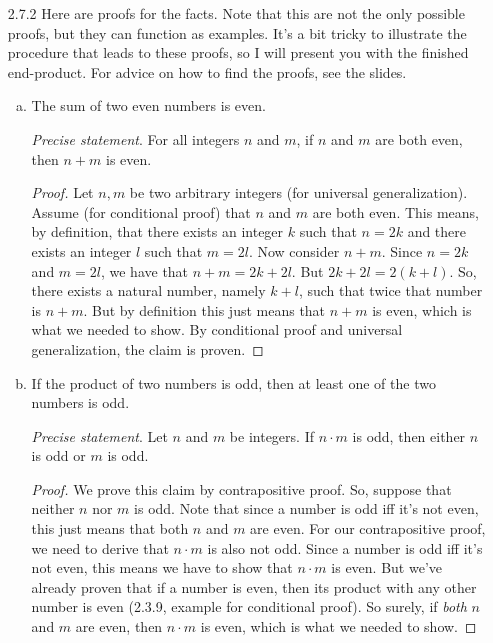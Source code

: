 \begin{enumerate}
		\item[2.7.2] Here are proofs for the facts. Note that this are not the only possible proofs, but they can function as examples. It's a bit tricky to illustrate the procedure that leads to these proofs, so I will present you with the finished end-product. For advice on how to find the proofs, see the slides.

			\begin{enumerate}[(a)]

			\item  The sum of two even numbers is even.
			
				\emph{Precise statement}. For all integers $n$ and $m$, if $n$ and $m$ are both even, then $n+m$ is even.
			
				\begin{proof}
				Let $n,m$ be two arbitrary integers (for universal generalization). Assume (for conditional proof) that $n$ and $m$ are both even. This means, by definition, that there exists an integer $k$ such that $n=2k$ and there exists an integer $l$ such that $m=2l$. Now consider $n+m$. Since $n=2k$ and $m=2l$, we have that $n+m=2k+2l$. But $2k+2l=2(k+l)$. So, there exists a natural number, namely $k+l$, such that twice that number is $n+m$. But by definition this just means that $n+m$ is even, which is what we needed to show. By conditional proof and universal generalization, the claim is proven.
				\end{proof}
			
			\item If the product of two numbers is odd, then at least one of the two numbers is odd. 
			
			\emph{Precise statement}. Let $n$ and $m$ be integers. If $n\cdot m$ is odd, then either $n$ is odd or $m$ is odd.
			
				\begin{proof}
				We prove this claim by contrapositive proof. So, suppose that neither $n$ nor $m$ is odd. Note that since a number is odd iff it's not even, this just means that both $n$ and $m$ are even. For our contrapositive proof, we need to derive that $n\cdot m$ is also not odd. Since a number is odd iff it's not even, this means we have to show that $n\cdot m$ is even.  But we've already proven that if a number is even, then its product with any other number is even (2.3.9, example for conditional proof). So surely, if \emph{both} $n$ and $m$ are even, then $n\cdot m$ is even, which is what we needed to show.
				\end{proof}
			

\end{enumerate}
\end{enumerate}
